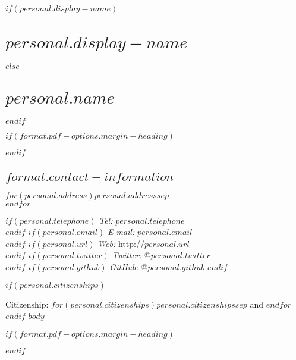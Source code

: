 \documentclass[%
  $if(format.pdf-options.papersize)$
    $format.pdf-options.papersize$paper,
  $endif$
  $format.pdf-options.typesize$,
  oneside
  ]{memoir}
\let\oldsection\section
\renewcommand{\section}[1]{%
  \oldsection{#1}
  \leavevmode
  \par
  \vspace{\dimexpr-\baselineskip-\parskip}
}
\begin{document}
  $if(personal.display-name)$
    \chapter*{$personal.display-name$}
  $else$
    \chapter*{$personal.name$}
  $endif$

$if(format.pdf-options.margin-heading)$
  \begin{adjustwidth*}{9em}{0em}
  \mbox{}
$endif$

  \hypertarget{contact-information}{%
  \section{$format.contact-information$}\label{contact-information}}
    \begin{minipage}[t]{0.3\textwidth}
      $for(personal.address)$$personal.address$$sep$\\ $endfor$
    \end{minipage}
    \begin{minipage}[t]{0.7\textwidth}
        $if(personal.telephone)$
        {\textit{Tel:}} $personal.telephone$ \\
        $endif$
        $if(personal.email)$
        {\textit{E-mail:}} $personal.email$ \\
        $endif$
        $if(personal.url)$
        {\textit{Web:}} http://$personal.url$ \\
        $endif$
        $if(personal.twitter)$
        {\textit{Twitter:}} \href{http://twitter.com/$personal.twitter$}{@$personal.twitter$} \\
        $endif$
        $if(personal.github)$
        {\textit{GitHub:}} \href{http://github.com/$personal.github$}{@$personal.github$}
        $endif$
    \end{minipage}
  $if(personal.citizenships)$
    \medskip%
    \par Citizenship:
    $for(personal.citizenships)$$personal.citizenships$$sep$ and $endfor$
  $endif$
$body$

$if(format.pdf-options.margin-heading)$
  \end{adjustwidth*}
$endif$
\end{document}

